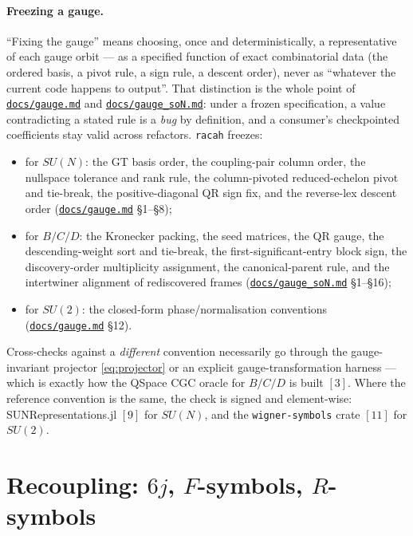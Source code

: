 \documentclass[11pt,a4paper]{article}
\theoremstyle{plain}
\theoremstyle{definition}
\newcommand{\code}[1]{\texttt{#1}}
\newcommand{\gaugemd}{\href{https://github.com/Ryo-wtnb11/racah/blob/main/docs/gauge.md}{\code{docs/gauge.md}}}
\newcommand{\gaugeson}{\href{https://github.com/Ryo-wtnb11/racah/blob/main/docs/gauge_soN.md}{\code{docs/gauge\_soN.md}}}
\begin{document}
\paragraph{Freezing a gauge.} ``Fixing the gauge'' means choosing, once and
deterministically, a representative of each gauge orbit --- as a specified
function of exact combinatorial data (the ordered basis, a pivot rule, a sign
rule, a descent order), never as ``whatever the current code happens to
output''. That distinction is the whole point of \gaugemd{} and \gaugeson{}:
under a frozen specification, a value contradicting a stated rule is a
\emph{bug} by definition, and a consumer's checkpointed coefficients stay valid
across refactors. \code{racah} freezes:

\begin{itemize}[leftmargin=1.4em]
  \item for $SU(N)$: the GT basis order, the coupling-pair column order, the
    nullspace tolerance and rank rule, the column-pivoted reduced-echelon pivot
    and tie-break, the positive-diagonal QR sign fix, and the reverse-lex
    descent order (\gaugemd{} \S1--\S8);
  \item for $B/C/D$: the Kronecker packing, the seed matrices, the QR gauge,
    the descending-weight sort and tie-break, the first-significant-entry block
    sign, the discovery-order multiplicity assignment, the canonical-parent
    rule, and the intertwiner alignment of rediscovered frames
    (\gaugeson{} \S1--\S16);
  \item for $SU(2)$: the closed-form phase/normalisation conventions
    (\gaugemd{} \S12).
\end{itemize}

Cross-checks against a \emph{different} convention necessarily go through the
gauge-invariant projector \eqref{eq:projector} or an explicit
gauge-transformation harness --- which is exactly how the QSpace CGC oracle for
$B/C/D$ is built $[3]$. Where the reference convention is the same, the check
is signed and element-wise: SUNRepresentations.jl $[9]$ for $SU(N)$, and the
\code{wigner-symbols} crate $[11]$ for $SU(2)$.

\section{Recoupling: $6j$, $F$-symbols, $R$-symbols}
\label{sec:recoupling}
\end{document}
